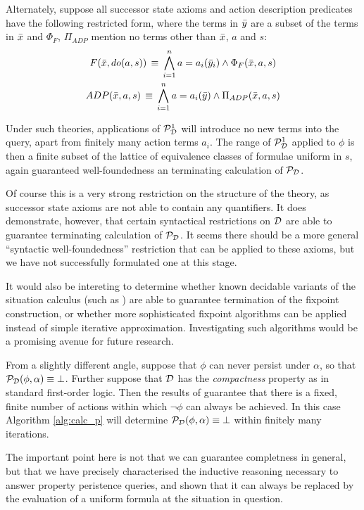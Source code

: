 Alternately, suppose all successor state axioms and action description
predicates have the following restricted form, where the terms in
$\bar{y}$ are a subset of the terms in $\bar{x}$ and $\Phi_{F}$,
$\Pi_{ADP}$ mention no terms other than $\bar{x}$, $a$ and $s$:\begin{gather*}
F(\bar{x},do(a,s))\,\equiv\,\bigwedge_{i=1}^{n}a=a_{i}(\bar{y}_{i})\wedge\Phi_{F}(\bar{x},a,s)\\
ADP(\bar{x},a,s)\,\equiv\,\bigwedge_{i=1}^{n}a=a_{i}(\bar{y})\wedge\Pi_{ADP}(\bar{x},a,s)\end{gather*}


Under such theories, applications of $\mathcal{P}^{1}_{\mathcal{D}}$ will introduce no new
terms into the query, apart from finitely many action terms $a_{i}$.
The range of $\mathcal{P}^{1}_{\mathcal{D}}$ applied to $\phi$ is then a finite subset
of the lattice of equivalence classes of formulae uniform in $s$,
again guaranteed well-foundedness an terminating calculation of $\mathcal{P}_{\mathcal{D}}$.

Of course this is a very strong restriction on the structure of the
theory, as successor state axioms are not able to contain any quantifiers.
It does demonstrate, however, that certain syntactical restrictions
on $\mathcal{D}$ are able to guarantee terminating calculation of $\mathcal{P}_{\mathcal{D}}$.
It seems there should be a more general {}``syntactic well-foundedness''
restriction that can be applied to these axioms, but we have not successfully
formulated one at this stage.

It would also be intereting to determine whether known decidable variants
of the situation calculus (such as \citep{yu07twovar_sitcalc}) are
able to guarantee termination of the fixpoint construction, or whether
more sophisticated fixpoint algorithms can be applied instead of simple
iterative approximation. Investigating such algorithms would be a
promising avenue for future research.

From a slightly different angle, suppose that $\phi$ can never persist
under $\alpha$, so that $\mathcal{P}_{\mathcal{D}}(\phi,\alpha)\equiv\bot$. Further
suppose that $\mathcal{D}$ has the \emph{compactness }property as in standard
first-order logic. Then the results of \citep{savelli06sc_quantum_levels}
guarantee that there is a fixed, finite number of actions within which
$\neg\phi$ can always be achieved. In this case Algorithm \ref{alg:calc_p}
will determine $\mathcal{P}_{\mathcal{D}}(\phi,\alpha)\equiv\bot$ within finitely many
iterations.

The important point here is not that we can guarantee completness
in general, but that we have precisely characterised the inductive
reasoning necessary to answer property peristence queries, and shown
that it can always be replaced by the evaluation of a uniform formula
at the situation in question.


